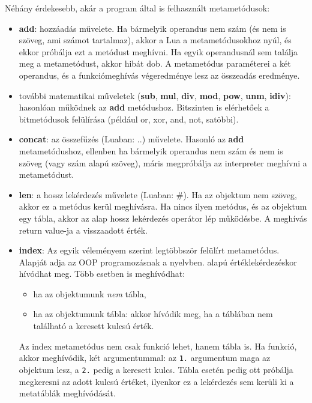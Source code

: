 Néhány érdekesebb, akár a program által is felhasznált metametódusok:
\begin{itemize}
	\item \detokenize{__}\textbf{add}: hozzáadás művelete. Ha bármelyik operandus nem szám (és nem is szöveg, ami számot tartalmaz), akkor a Lua a metametódusokhoz nyúl, és ekkor próbálja ezt a metódust meghívni. Ha egyik operandusnál sem találja meg a metametódust, akkor hibát dob. A metametódus paraméterei a két operandus, és a funkciómeghívás végeredménye lesz az összeadás eredménye.
	\item további matematikai műveletek (\detokenize{__}\textbf{sub}, \detokenize{__}\textbf{mul}, \detokenize{__}\textbf{div}, \detokenize{__}\textbf{mod}, \detokenize{__}\textbf{pow}, \detokenize{__}\textbf{unm}, \detokenize{__}\textbf{idiv}): hasonlóan működnek az \detokenize{__}\textbf{add} metódushoz. Bitszinten is elérhetőek a bitmetódusok felülírása (például or, xor, and, not, satöbbi).
	\item \detokenize{__}\textbf{concat}: az összefűzés (Luaban: ..) művelete. Hasonló az \detokenize{__}\textbf{add} metametódushoz, ellenben ha bármelyik operandus nem szám és nem is szöveg (vagy szám alapú szöveg), máris megpróbálja az interpreter meghívni a metametódust.
	\item \detokenize{__}\textbf{len}: a hossz lekérdezés művelete (Luaban: \#). Ha az objektum nem szöveg, akkor ez a metódus kerül meghívásra. Ha nincs ilyen metódus, és az objektum egy tábla, akkor az alap hossz lekérdezés operátor lép működésbe. A meghívás return value-ja a visszaadott érték.
	\pagebreak
	\item \detokenize{__}\textbf{index}: Az egyik véleményem szerint legtöbbször felülírt metametódus. Alapját adja az OOP programozásnak a nyelvben. \texttt{} alapú értéklekérdezéskor hívódhat meg. Több esetben is meghívódhat:
		\begin{itemize}
			\item ha az objektumunk \textit{nem} tábla,
			\item ha az objektumunk tábla: akkor hívódik meg, ha a táblában nem található a keresett kulcsú érték.
		\end{itemize} Az index metametódus nem csak funkció lehet, hanem tábla is. Ha funkció, akkor meghívódik, két argumentummal: az \texttt{1.} argumentum maga az objektum lesz, a \texttt{2.} pedig a keresett kulcs. Tábla esetén pedig ott próbálja megkeresni az adott kulcsú értéket, ilyenkor ez a lekérdezés sem kerüli ki a metatáblák meghívódását.

\end{itemize}
